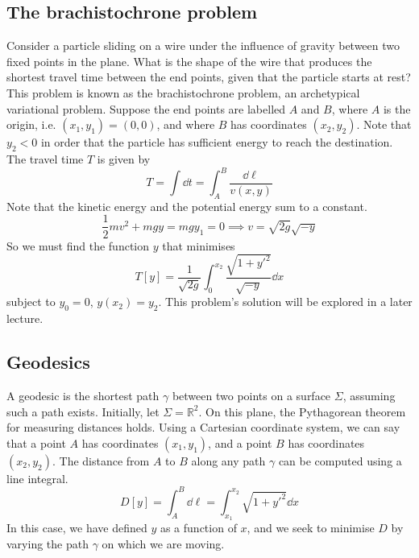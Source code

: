 \subsection{The brachistochrone problem}
Consider a particle sliding on a wire under the influence of gravity between two fixed points in the plane.
What is the shape of the wire that produces the shortest travel time between the end points, given that the particle starts at rest?
This problem is known as the brachistochrone problem, an archetypical variational problem.
Suppose the end points are labelled \(A\) and \(B\), where \(A\) is the origin, i.e.
\((x_1, y_1) = (0, 0)\), and where \(B\) has coordinates \((x_2, y_2)\).
Note that \(y_2 < 0\) in order that the particle has sufficient energy to reach the destination.
The travel time \(T\) is given by
\[
	T = \int \dd{t} = \int_A^B \frac{\dd{\ell}}{v(x, y)}
\]
Note that the kinetic energy and the potential energy sum to a constant.
\[
	\frac{1}{2}mv^2 + mgy = mgy_1 = 0 \implies v = \sqrt{2g}\sqrt{-y}
\]
So we must find the function \(y\) that minimises
\[
	T[y] = \frac{1}{\sqrt{2g}} \int_0^{x_2} \frac{\sqrt{1+y'^2}}{\sqrt{-y}}\dd{x}
\]
subject to \(y_0 = 0\), \(y(x_2) = y_2\).
This problem's solution will be explored in a later lecture.

\subsection{Geodesics}
A geodesic is the shortest path \(\gamma\) between two points on a surface \(\Sigma\), assuming such a path exists.
Initially, let \(\Sigma = \mathbb R^2\).
On this plane, the Pythagorean theorem for measuring distances holds.
Using a Cartesian coordinate system, we can say that a point \(A\) has coordinates \((x_1, y_1)\), and a point \(B\) has coordinates \((x_2, y_2)\).
The distance from \(A\) to \(B\) along any path \(\gamma\) can be computed using a line integral.
\[
	D[y] = \int_A^B \dd{\ell} = \int_{x_1}^{x_2} \sqrt{1+y'^2}\dd{x}
\]
In this case, we have defined \(y\) as a function of \(x\), and we seek to minimise \(D\) by varying the path \(\gamma\) on which we are moving.

